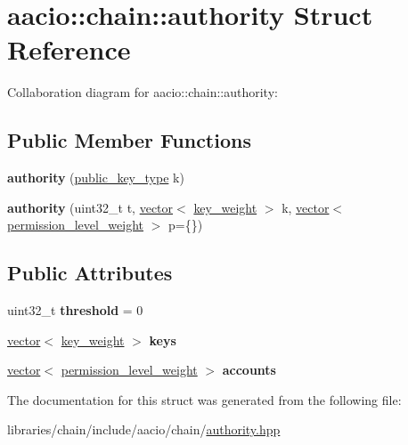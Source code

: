 \hypertarget{structaacio_1_1chain_1_1authority}{}\section{aacio\+:\+:chain\+:\+:authority Struct Reference}
\label{structaacio_1_1chain_1_1authority}


Collaboration diagram for aacio\+:\+:chain\+:\+:authority\+:
\subsection*{Public Member Functions}
\begin{DoxyCompactItemize}
\item 
\mbox{\label{structaacio_1_1chain_1_1authority_acff31a60730e9cc5707552d41257fbfa}} 
{\bfseries authority} (\mbox{\hyperlink{classfc_1_1crypto_1_1public__key}{public\+\_\+key\+\_\+type}} k)
\item 
\mbox{\label{structaacio_1_1chain_1_1authority_a4aece505daf614a7eaeefb461e7c2224}} 
{\bfseries authority} (uint32\+\_\+t t, \mbox{\hyperlink{classstd_1_1vector}{vector}}$<$ \mbox{\hyperlink{structaacio_1_1chain_1_1key__weight}{key\+\_\+weight}} $>$ k, \mbox{\hyperlink{classstd_1_1vector}{vector}}$<$ \mbox{\hyperlink{structaacio_1_1chain_1_1permission__level__weight}{permission\+\_\+level\+\_\+weight}} $>$ p=\{\})
\end{DoxyCompactItemize}
\subsection*{Public Attributes}
\begin{DoxyCompactItemize}
\item 
\mbox{\label{structaacio_1_1chain_1_1authority_a67974e6a25a1e878ddbb1f2ed1cccebc}} 
uint32\+\_\+t {\bfseries threshold} = 0
\item 
\mbox{\label{structaacio_1_1chain_1_1authority_ab206a4002cbf7f103b5d6d50e78824a5}} 
\mbox{\hyperlink{classstd_1_1vector}{vector}}$<$ \mbox{\hyperlink{structaacio_1_1chain_1_1key__weight}{key\+\_\+weight}} $>$ {\bfseries keys}
\item 
\mbox{\label{structaacio_1_1chain_1_1authority_a29d06a82359675a6fa91879e101db4f6}} 
\mbox{\hyperlink{classstd_1_1vector}{vector}}$<$ \mbox{\hyperlink{structaacio_1_1chain_1_1permission__level__weight}{permission\+\_\+level\+\_\+weight}} $>$ {\bfseries accounts}
\end{DoxyCompactItemize}


The documentation for this struct was generated from the following file\+:\begin{DoxyCompactItemize}
\item 
libraries/chain/include/aacio/chain/\mbox{\hyperlink{authority_8hpp}{authority.\+hpp}}\end{DoxyCompactItemize}
